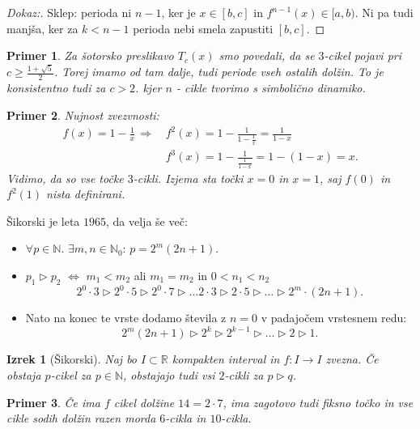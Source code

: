 \documentclass{article}
\newtheorem{primer}{Primer}
\newtheorem{izrek}{Izrek}
\newcommand{\N}{\mathbb{N}}
\newcommand{\R}{\mathbb{R}}
\begin{document}
\begin{proof}[Dokaz:]
Sklep: perioda ni $n-1$, ker je $x\in [b, c]$ in $f^{n-1}(x)\in [a, b)$. 
Ni pa tudi manjša, ker za $k < n-1$ perioda nebi smela zapustiti $[b, c]$.
\end{proof}

\begin{primer}
Za šotorsko preslikavo $T_c(x)$ smo povedali, da se $3$-cikel pojavi 
pri $c \geq \frac{1 + \sqrt{5}}{2}$. Torej imamo od tam dalje, tudi periode 
vseh ostalih dolžin. To je konsistentno tudi za $c > 2$. kjer $n$ - cikle 
tvorimo s simbolično dinamiko. 
\end{primer}

\begin{primer}
Nujnost zvezvnosti: 
\begin{align*}
f(x) = 1 - \frac{1}{x} \,\Longrightarrow\, &f^2(x) = 1 - \frac{1}{1 - \frac{1}{x}} = \frac{1}{1-x} \\
&f^3(x) = 1 - \frac{1}{\frac{1}{1-x}} = 1 - (1-x) = x.
\end{align*}
Vidimo, da so vse točke $3$-cikli. Izjema sta točki $x = 0$ in $x = 1$, 
saj $f(0)$ in $f^2(1)$ nista definirani.
\end{primer}

Šikorski je leta $1965$, da velja še več: 
\begin{itemize}
    \item $\forall p\in \N$. $\exists m, n\in \N_0$: $p = 2^m(2n+1)$.
    \item $p_1 \triangleright p_2$ $\iff$ $m_1 < m_2$ ali $m_1 = m_2$ in $0 < n_1 < n_2$
    $$
    2^0 \cdot 3 \triangleright 2^0 \cdot 5 \triangleright 2^0 \cdot 7 \triangleright \dots 2\cdot 3 \triangleright 2\cdot 5 \triangleright \dots \triangleright 2^m \cdot (2n+1).
    $$
    \item Nato na konec te vrste dodamo števila z $n=0$ v padajočem 
    vrstesnem redu:
    $$
    2^m (2n+1) \triangleright 2^k \triangleright 2^{k-1} \triangleright \dots \triangleright 2 \triangleright 1.
    $$
\end{itemize}

\begin{izrek}[Šikorski]
Naj bo $I \subset \R$ kompakten interval in $f: I \rightarrow I$ zvezna.
Če obstaja $p$-cikel za $p\in \N$, obstajajo tudi vsi $2$-cikli 
za $p\triangleright q$.
\end{izrek}

\begin{primer}
Če ima $f$ cikel dolžine $14 = 2\cdot 7$, ima zagotovo tudi fiksno 
točko in vse cikle sodih dolžin razen morda $6$-cikla in $10$-cikla.
\end{primer}
\end{document}
